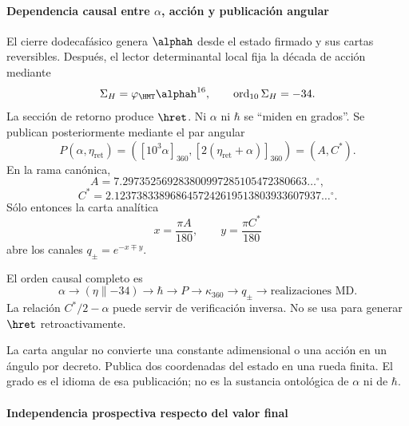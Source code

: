 \paragraph{Dependencia causal entre \(\alpha\), acción y publicación angular}

El cierre dodecafásico genera \(\alphah\) desde el estado firmado y sus
cartas reversibles. Después, el lector determinantal local fija la década de
acción mediante
\[
\Sigma_H=\varphi_{\HMT}\alphah^{16},
\qquad \operatorname{ord}_{10}\Sigma_H=-34.
\]
La sección de retorno produce \(\hret\). Ni \(\alpha\) ni \(\hbar\) se
\enquote{miden en grados}. Se publican posteriormente mediante el par angular
\begin{equation}
P(\alpha,\eta_{\mathrm{ret}})=
\left([10^3\alpha]_{360},[2(\eta_{\mathrm{ret}}+\alpha)]_{360}\right)
=(A,C^*).
\label{eq:parangular}
\end{equation}
En la rama canónica,
\[
A=7.297352569283800997285105472380663\ldots{}^\circ,
\]
\[
C^*=2.1237383389686457242619513803933607937\ldots{}^\circ.
\]
Sólo entonces la carta analítica
\[
x=\frac{\pi A}{180},\qquad y=\frac{\pi C^*}{180}
\]
abre los canales \(q_\pm=e^{-x\mp y}\).

El orden causal completo es
\[
\alpha\to(\eta\parallel-34)\to\hbar
\to P\to\kappa_{360}\to q_\pm
\to\text{realizaciones MD}.
\]
La relación \(C^*/2-\alpha\) puede servir de verificación inversa. No se usa
para generar \(\hret\) retroactivamente.

\begin{narrativebox}
La carta angular no convierte una constante adimensional o una acción en un
ángulo por decreto. Publica dos coordenadas del estado en una rueda finita.
El grado es el idioma de esa publicación; no es la sustancia ontológica de
\(\alpha\) ni de \(\hbar\).
\end{narrativebox}
\paragraph{Independencia prospectiva respecto del valor final}


